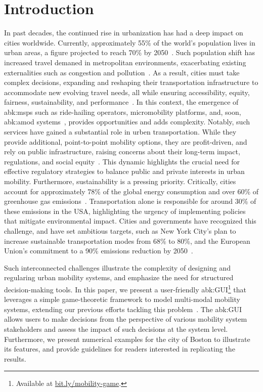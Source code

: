 \section{Introduction}
\label{sec:introduction}
In past decades, the continued rise in urbanization has had a deep impact on cities worldwide.
Currently, approximately 55\% of the world's population lives in urban areas, a figure projected to reach 70\% by 2050~\cite{un2020}.
Such population shift has increased travel demaned in metropolitan environments, exacerbating existing externalities such as congestion and pollution~\cite{czepkiewicz2018urbanites}.
As a result, cities must take complex decisions, expanding and reshaping their transportation infrastructure to accommodate new evolving travel needs, all while ensuring accessibility, equity, fairness, sustainability, and performance~\cite{ranchordas2020smart}.
%
In this context, the emergence of \glspl{abk:msp} such as ride-hailing operators, micromobility platforms, and, soon, \gls{abk:amod} systems~\cite{zardinilanzettiAR2021}, provides opportunities and adds complexity.
Notably, such services have gained a substantial role in urben transportation.
While they provide additional, point-to-point mobility options, they are profit-driven, and rely on public infrastructure, raising concerns about their long-term impact, regulations, and social equity~\cite{berger2018drivers,rogers2015social}.
This dynamic highlights the crucial need for effective regulatory strategies to balance public and private interests in urban mobility.
Furthermore, sustainability is a pressing priority.
Critically, cities account for approximately 78\% of the global energy consumption and over 60\% of greenhouse gas emissions~\cite{un2020bis}. Transportation alone is responsible for around 30\% of these emissions in the USA, highlighting the urgency of implementing policies that mitigate environmental impact. 
Cities and governments have recognized this challenge, and have set ambitious targets, such as New York City's plan to increase sustainable transportation modes from 68\% to 80\%, and the European Union's commitment to a 90\% emissions reduction by 2050~\cite{euplan2020,OneNYC}.

\noindent Such interconnected challenges illustrate the complexity of designing and regularing urban mobility systems, and emphasize the need for structured decision-making tools.
In this paper, we present a user-friendly \gls{abk:GUI}\footnote{Available at \href{https://bit.ly/mobility-game}{bit.ly/mobility-game}.} that leverages a simple game-theoretic framework to model multi-modal mobility systems, extending our previous efforts tackling this problem~\cite{zardinilanzetti2021,zardinilanzetti2023,zardini2023camod}.
The \gls{abk:GUI} allows users to make decisions from the perspective of various mobility system stakeholders and assess the impact of such decisions at the system level.
Furthermore, we present numerical examples for the city of Boston to illustrate its features, and provide guidelines for readers interested in replicating the results.

